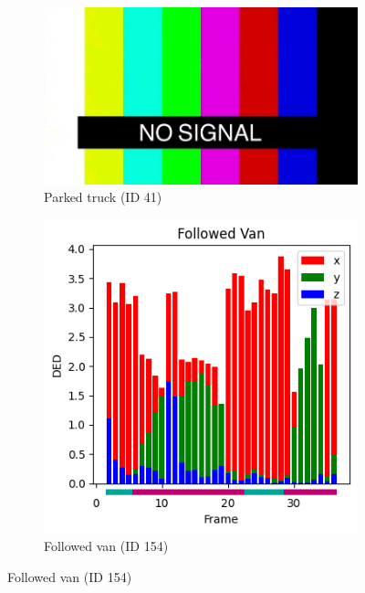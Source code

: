 \begin{figure}[h!]
    \centering
    \begin{subfigure}[b]{0.32\textwidth}
        \includegraphics[width=\linewidth]{images/shared/no_signal.jpg}
        \caption{Parked truck (ID 41)}
        \label{fig:scene_ded_cases_a}
    \end{subfigure}
    \hfill
    \begin{subfigure}[b]{0.32\textwidth}
        \includegraphics[width=\textwidth]{images/experiments/evaluation_frames/ded_followed_van_id154.png}
        \caption{Followed van (ID 154)}
        \label{fig:scene_ded_cases_b}
    \end{subfigure}

\end{figure}
